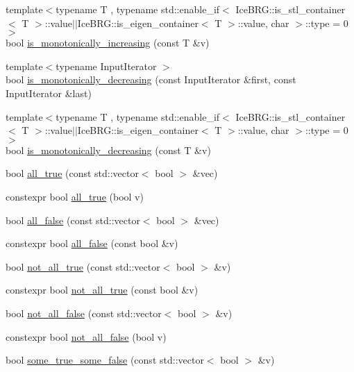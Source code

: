 \begin{DoxyCompactItemize}
\item 
{\footnotesize template$<$typename T , typename std\-::enable\-\_\-if$<$ Ice\-B\-R\-G\-::is\-\_\-stl\-\_\-container$<$ T $>$\-::value$|$$|$\-Ice\-B\-R\-G\-::is\-\_\-eigen\-\_\-container$<$ T $>$\-::value, char $>$\-::type  = 0$>$ }\\bool \hyperlink{namespaceIceBRG_a6d6258193eb3feced10b23ca662473bb}{is\-\_\-monotonically\-\_\-increasing} (const T \&v)
\item 
{\footnotesize template$<$typename Input\-Iterator $>$ }\\bool \hyperlink{namespaceIceBRG_a5de3f3893745c6fa915ca2e820344187}{is\-\_\-monotonically\-\_\-decreasing} (const Input\-Iterator \&first, const Input\-Iterator \&last)
\item 
{\footnotesize template$<$typename T , typename std\-::enable\-\_\-if$<$ Ice\-B\-R\-G\-::is\-\_\-stl\-\_\-container$<$ T $>$\-::value$|$$|$\-Ice\-B\-R\-G\-::is\-\_\-eigen\-\_\-container$<$ T $>$\-::value, char $>$\-::type  = 0$>$ }\\bool \hyperlink{namespaceIceBRG_aedd0e74fc4343d564368d1015137ef5a}{is\-\_\-monotonically\-\_\-decreasing} (const T \&v)
\item 
bool \hyperlink{namespaceIceBRG_af9098bcac037682e8986a8ec5d88c79b}{all\-\_\-true} (const std\-::vector$<$ bool $>$ \&vec)
\item 
constexpr bool \hyperlink{namespaceIceBRG_a7d2ac823d6961756fe9ea54bf87b8111}{all\-\_\-true} (bool v)
\item 
bool \hyperlink{namespaceIceBRG_a48a767b435f4ff5ef45ff7f867a19c18}{all\-\_\-false} (const std\-::vector$<$ bool $>$ \&vec)
\item 
constexpr bool \hyperlink{namespaceIceBRG_a6885c450dd3bfb50871f75f3a97347a0}{all\-\_\-false} (const bool \&v)
\item 
bool \hyperlink{namespaceIceBRG_aed7c90957522d926cb86c1b40795d3a9}{not\-\_\-all\-\_\-true} (const std\-::vector$<$ bool $>$ \&v)
\item 
constexpr bool \hyperlink{namespaceIceBRG_ae181e2ded84f5b9ae71d0fba832e07b0}{not\-\_\-all\-\_\-true} (const bool \&v)
\item 
bool \hyperlink{namespaceIceBRG_aa8d6b83bee6ce0255f06dd70a2071b3b}{not\-\_\-all\-\_\-false} (const std\-::vector$<$ bool $>$ \&v)
\item 
constexpr bool \hyperlink{namespaceIceBRG_aae5dc775b1239b7484b099924efd31a9}{not\-\_\-all\-\_\-false} (bool v)
\item 
bool \hyperlink{namespaceIceBRG_a24a36d7ed494d21773993a0d6bd7f402}{some\-\_\-true\-\_\-some\-\_\-false} (const std\-::vector$<$ bool $>$ \&v)

\end{DoxyCompactItemize}
